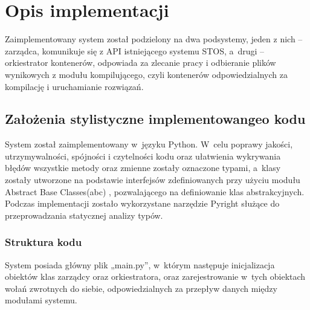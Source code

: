 \section{Opis implementacji}
Zaimplementowany system został podzielony na dwa podsystemy, jeden z nich -- zarządca, komunikuje się z API istniejącego systemu STOS, a~drugi -- orkiestrator kontenerów, odpowiada za zlecanie pracy i odbieranie plików wynikowych z modułu kompilującego, czyli kontenerów odpowiedzialnych za kompilację i uruchamianie rozwiązań.

\subsection{Założenia stylistyczne implementowangeo kodu}
System został zaimplementowany w~języku Python. W~celu poprawy jakości, utrzymywalności, spójności i czytelności kodu oraz ułatwienia wykrywania błędów wszystkie metody oraz zmienne zostały oznaczone typami, a~klasy zostały utworzone na podstawie interfejsów zdefiniowanych przy użyciu modułu Abstract Base Classes(abc) \cite{pythonAbc}, pozwalającego na definiowanie klas abstrakcyjnych. Podczas implementacji zostało wykorzystane narzędzie Pyright służące do przeprowadzania statycznej analizy typów.

\subsubsection{Struktura kodu}
System posiada główny plik „main.py”, w~którym następuje inicjalizacja obiektów klas zarządcy oraz orkiestratora, oraz zarejestrowanie w~tych obiektach wołań zwrotnych do siebie, odpowiedzialnych za przepływ danych między modułami systemu.
